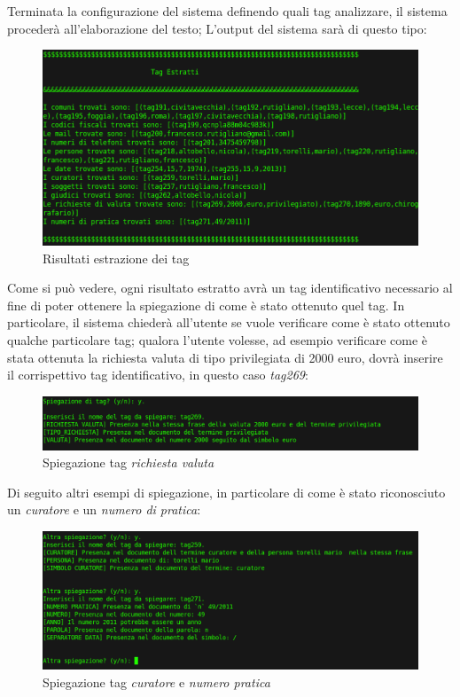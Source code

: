 Terminata la configurazione del sistema definendo quali tag analizzare, il sistema procederà all'elaborazione del testo; L'output del sistema sarà di questo tipo:
\begin{figure}[H]
	\includegraphics[width=1\textwidth]{img/interfaces/bash-result.png}
	\caption[Schermata bash result]{Risultati estrazione dei tag}
	\label{bash-result}
\end{figure}

Come si può vedere, ogni risultato estratto avrà un tag identificativo necessario al fine di poter ottenere la spiegazione di come è stato ottenuto quel tag. In particolare, il sistema chiederà all'utente se vuole verificare come è stato ottenuto qualche particolare tag; qualora l'utente volesse, ad esempio verificare come è stata ottenuta la richiesta valuta di tipo privilegiata di 2000 euro, dovrà inserire il corrispettivo tag identificativo, in questo caso \emph{tag269}:

\begin{figure}[H]
	\includegraphics[width=1\textwidth]{img/interfaces/bash-spiegazioneRich.png}
	\caption[Schermata bash spiegazione]{Spiegazione tag \emph{richiesta valuta}}
	\label{bash-spiegaRichiesta}
\end{figure}

Di seguito altri esempi di spiegazione, in particolare di come è stato riconosciuto un \emph{curatore} e un \emph{numero di pratica}:
\begin{figure}[H]
	\includegraphics[width=1\textwidth]{img/interfaces/bash-spiegazione.png}
	\caption[Schermata bash altre spiegazioni]{Spiegazione tag \emph{curatore} e \emph{numero pratica}}
	\label{bash-spiega}
\end{figure}


